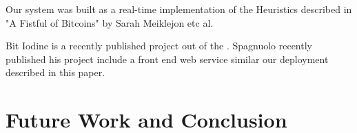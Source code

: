 \documentclass[10pt, letterpaper, twocolumn, twoside]{article}
\begin{document}
Our system was built as a real-time implementation of the Heuristics described in "A Fistful of Bitcoins" by Sarah Meiklejon etc al. 

Bit Iodine is a recently published project out of the . Spagnuolo recently published his project include a front end web service similar our deployment described in this paper.


\section{Future Work and Conclusion}




\end{document}
